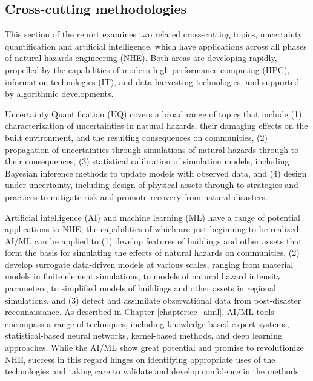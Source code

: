
\begin{partbacktext}
\part{Cross-cutting methodologies}

This section of the report examines two related cross-cutting topics, uncertainty quantification and artificial intelligence, which have applications across all phases of natural hazards engineering (NHE).  Both areas are developing rapidly, propelled by the capabilities of modern high-performance computing (HPC), information technologies (IT), and data harvesting technologies, and supported by algorithmic developments.  

Uncertainty Quantification (UQ) covers a broad range of topics that include (1) characterization of uncertainties in natural hazards, their damaging effects on the built environment, and the resulting consequences on communities, (2) propagation of uncertainties through simulations of natural hazards through to their consequences, (3) statistical calibration of simulation models, including Bayesian inference methods to update models with observed data, and (4) design under uncertainty, including design of physical assets through to strategies and practices to mitigate risk and promote recovery from natural disasters.  

Artificial intelligence (AI) and machine learning (ML) have a range of potential applications to NHE, the capabilities of which are just beginning to be realized.   AI/ML can be applied to (1) develop features of buildings and other assets that form the basis for simulating the effects of natural hazards on communities, (2) develop surrogate data-driven models at various scales, ranging from material models in finite element simulations, to models of natural hazard intensity parameters, to simplified models of buildings and other assets in regional simulations, and (3) detect and assimilate observational data from post-disaster reconnaissance.  As described in Chapter \ref{chapter:cc_aiml}, AI/ML tools encompass a range of techniques, including knowledge-based expert systems, statistical-based neural networks, kernel-based methods, and deep learning approaches.   While the AI/ML show great potential and promise to revolutionize NHE, success in this regard hinges on identifying appropriate uses of the technologies and taking care to validate and develop confidence in the methods.


\end{partbacktext}